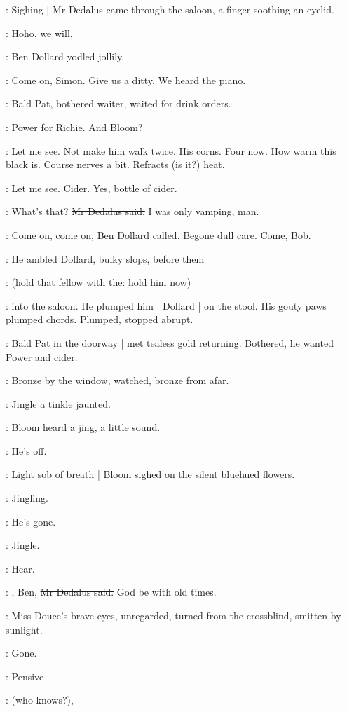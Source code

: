 :
Sighing |
Mr Dedalus came through the saloon,
a finger soothing an eyelid.

\dollard:
Hoho,
we will,

:
Ben Dollard yodled jollily.

\dollard:
Come on,
Simon.
Give us a ditty.
We heard the piano.

:
Bald Pat,
bothered waiter,
waited for drink orders.

:
Power for Richie.
And Bloom?

\BloomInt:
Let me see.
Not make him walk twice.
His corns.
Four now.
How warm this black is.
Course nerves a bit.
Refracts (is it?) heat.

\Bloom:
Let me see.
Cider.
Yes,
bottle of cider.

\simon:
What's that?
\sout{Mr Dedalus said.}
I was only vamping,
man.

\dollard:
Come on,
come on,
\sout{Ben Dollard called.}
Begone dull care.
Come,
Bob.

:
He ambled Dollard,
bulky slops,
before them

\simon:
(hold that fellow with the:
hold him now)

:
into the saloon.
He plumped him |
Dollard |
on the stool.
His gouty paws plumped chords.
Plumped,
stopped abrupt.

:
Bald Pat in the doorway |
met tealess gold returning.
Bothered,
he wanted Power and cider.

:
Bronze by the window,
watched,
bronze from afar.

:
Jingle a tinkle jaunted.

:
Bloom heard a jing,
a little sound.

\BloomInt:
He's off.

:
Light sob of breath |
Bloom sighed on the silent bluehued flowers.

:
Jingling.

\BloomInt:
He's gone.

:
Jingle.

\BloomInt:
Hear.

\simon:
, Ben,
\sout{Mr Dedalus said.}
God be with old times.

:
Miss Douce's brave eyes,
unregarded,
turned from the crossblind,
smitten by sunlight.

\MissDInt:
Gone.

:
Pensive

\MissDInt:
(who knows?),

